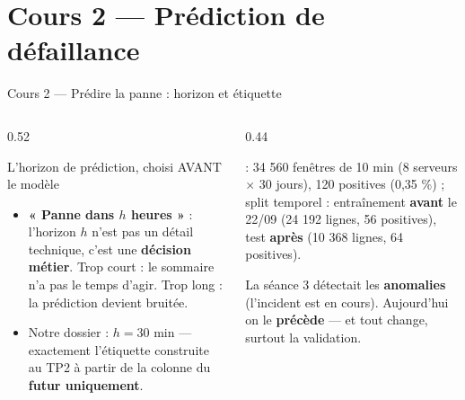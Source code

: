 \section{Cours 2 --- Prédiction de défaillance}

\begin{frame}{Cours 2 --- Prédire la panne : horizon et étiquette}
\begin{columns}[t]
\begin{column}{0.52\textwidth}
\begin{block}{L'horizon de prédiction, choisi AVANT le modèle}
\begin{itemize}
\item \textbf{« Panne dans $h$ heures »} : l'horizon $h$ n'est pas un
détail technique, c'est une \textbf{décision métier}. Trop court : le
sommaire n'a pas le temps d'agir. Trop long : la prédiction devient
bruitée.
\item Notre dossier : $h = 30$ min --- exactement l'étiquette
 construite au TP2 à partir de la colonne
 du \textbf{futur uniquement}.
\end{itemize}
\end{block}
\end{column}
\begin{column}{0.44\textwidth}
\begin{ebox}
 : 34 560 fenêtres de 10 min
(8 serveurs $\times$ 30 jours), 120 positives (0,35 \%) ;
split temporel : entraînement \textbf{avant} le 22/09 (24 192 lignes,
56 positives), test \textbf{après} (10 368 lignes, 64 positives).
\end{ebox}
\begin{kbox}
La séance 3 détectait les \textbf{anomalies} (l'incident est en cours).
Aujourd'hui on le \textbf{précède} --- et tout change, surtout la
validation.
\end{kbox}
\end{column}
\end{columns}
\end{frame}

